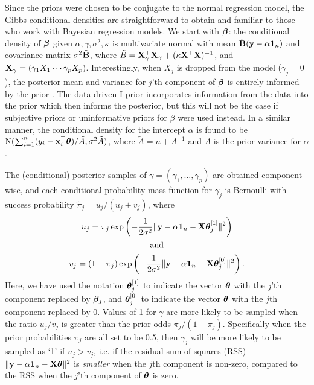 \documentclass[a4paper,showframe,11pt]{report}
\begin{document}
Since the priors were chosen to be conjugate to the normal regression model, the Gibbs conditional densities are straightforward to obtain and familiar to those who work with Bayesian regression models.
We start with ${\bm\beta}$: the conditional density of ${\bm\beta}$ given $\alpha,\gamma,\sigma^2,\kappa$ is multivariate normal with mean $\tilde {{\mathbf B}}({\mathbf y}-\alpha{\mathbf 1}_n)$ and covariance matrix $\sigma^2\tilde {{\mathbf B}}$, where $\tilde B = {\mathbf X}_\gamma^\top {\mathbf X}_\gamma + (\kappa \mathbf X^\top \mathbf X)^{-1}$, and ${\mathbf X}_\gamma = (\gamma_1X_1 \cdots \gamma_pX_p)$.
Interestingly, when $X_j$ is dropped from the model ($\gamma_j=0$), the posterior mean and variance for $j$'th component of ${\bm\beta}$ is entirely informed by the prior \citep{Kuo1998}.
The data-driven I-prior incorporates information from the data into the prior which then informs the posterior, but this will not be the case if subjective priors or uninformative priors for $\beta$ were used instead.
In a similar manner, the conditional density for the intercept $\alpha$ is found to be $\operatorname{N}(\sum_{i=1}^n(y_i - {\mathbf x}_i^\top{\bm\theta}) / \tilde A,\sigma^2\tilde A)$, where $\tilde A = n + A^{-1}$ and $A$ is the prior variance for $\alpha$.

The (conditional) posterior samples of $\gamma=(\gamma_1,\dots,\gamma_p)$ are obtained component-wise, and each conditional probability mass function for $\gamma_j$ is Bernoulli  with success probability $\tilde \pi_j = u_j / (u_j + v_j)$, where
\begin{align*}
  \begin{gathered}
    u_j = \pi_j \exp\left( - \frac{1}{2\sigma^2} \Vert {\mathbf y} - \alpha {\mathbf 1}_n - {\mathbf X}{\bm\theta}_j^{[1]} \Vert^2 \right) \\
    \text{and} \\
    v_j = (1-\pi_j) \exp\left( - \frac{1}{2\sigma^2} \Vert {\mathbf y} - \alpha {\mathbf 1}_n - {\mathbf X}{\bm\theta}_j^{[0]} \Vert^2 \right).
  \end{gathered}
\end{align*}
Here, we have used the notation ${\bm\theta}_j^{[1]}$ to indicate the vector ${\bm\theta}$ with the $j$'th component replaced by ${\bm\beta}_j$, and ${\bm\theta}_j^{[0]}$ to indicate the vector ${\bm\theta}$ with the $j$th component replaced by 0.
Values of 1 for $\gamma$ are more likely to be sampled when the ratio $u_j / v_j$ is greater than the prior odds $\pi_j/(1-\pi_j)$.
Specifically when the prior probabilities $\pi_j$ are all set to be 0.5, then $\gamma_j$ will be more likely to be sampled as `1' if $u_j > v_j$, i.e. if the residual sum of squares (RSS) $\Vert {\mathbf y} - \alpha{\mathbf 1}_n - {\mathbf X}{\bm\theta} \Vert^2$ is \emph{smaller} when the $j$th component is non-zero, compared to the RSS when the $j$'th component of ${\bm\theta}$ is zero.
\end{document}
